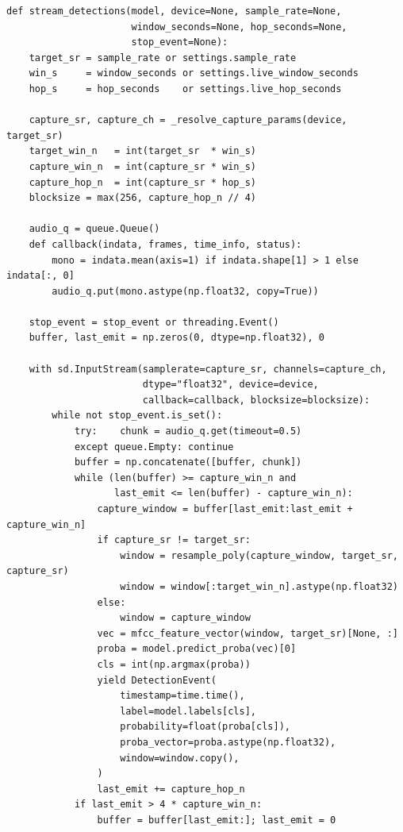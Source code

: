 \documentclass[11pt,a4paper]{article}
\begin{document}
\begin{lstlisting}[caption={Real-time'owa pętla detekcji (\texttt{live/mic.py}, fragment).},label={lst:live}]
def stream_detections(model, device=None, sample_rate=None,
                      window_seconds=None, hop_seconds=None,
                      stop_event=None):
    target_sr = sample_rate or settings.sample_rate
    win_s     = window_seconds or settings.live_window_seconds
    hop_s     = hop_seconds    or settings.live_hop_seconds

    capture_sr, capture_ch = _resolve_capture_params(device, target_sr)
    target_win_n   = int(target_sr  * win_s)
    capture_win_n  = int(capture_sr * win_s)
    capture_hop_n  = int(capture_sr * hop_s)
    blocksize = max(256, capture_hop_n // 4)

    audio_q = queue.Queue()
    def callback(indata, frames, time_info, status):
        mono = indata.mean(axis=1) if indata.shape[1] > 1 else indata[:, 0]
        audio_q.put(mono.astype(np.float32, copy=True))

    stop_event = stop_event or threading.Event()
    buffer, last_emit = np.zeros(0, dtype=np.float32), 0

    with sd.InputStream(samplerate=capture_sr, channels=capture_ch,
                        dtype="float32", device=device,
                        callback=callback, blocksize=blocksize):
        while not stop_event.is_set():
            try:    chunk = audio_q.get(timeout=0.5)
            except queue.Empty: continue
            buffer = np.concatenate([buffer, chunk])
            while (len(buffer) >= capture_win_n and
                   last_emit <= len(buffer) - capture_win_n):
                capture_window = buffer[last_emit:last_emit + capture_win_n]
                if capture_sr != target_sr:
                    window = resample_poly(capture_window, target_sr, capture_sr)
                    window = window[:target_win_n].astype(np.float32)
                else:
                    window = capture_window
                vec = mfcc_feature_vector(window, target_sr)[None, :]
                proba = model.predict_proba(vec)[0]
                cls = int(np.argmax(proba))
                yield DetectionEvent(
                    timestamp=time.time(),
                    label=model.labels[cls],
                    probability=float(proba[cls]),
                    proba_vector=proba.astype(np.float32),
                    window=window.copy(),
                )
                last_emit += capture_hop_n
            if last_emit > 4 * capture_win_n:
                buffer = buffer[last_emit:]; last_emit = 0
\end{lstlisting}
\end{document}
